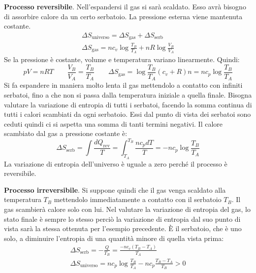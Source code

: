 \documentclass[10pt,a4paper]{book}
\begin{document}
\begin{figure}[htpb]
\end{figure}
\FloatBarrier

\textbf{Processo reversibile}. Nell'espandersi il gas si sarà scaldato. Esso avrà bisogno di assorbire calore da un certo serbatoio. La pressione esterna viene mantenuta costante.
\begin{gather*}
	\Delta S_{\text{universo} } = \Delta S_{\text{gas} } + \Delta S_{\text{serb} } \\
	\Delta S_{\text{gas} } = nc_v \log \frac{T_B }{T_A } + nR\log \frac{V_B }{V_A }
\end{gather*}
Se la pressione è costante, volume e temperatura variano linearmente. Quindi:
\[
	pV=nRT \qquad \frac{V_B }{V_A } = \frac{T_B }{T_A } \qquad \Delta S_{\text{gas} } = \log \frac{T_B }{T_A }(c_v+R)n = nc_p\log \frac{T_B }{T_A }
\]
Si fa espandere in maniera molto lenta il gas mettendolo a contatto con infiniti serbatoi, fino a che non si passa dalla temperatura iniziale a quella finale. Bisogna valutare la variazione di entropia di tutti i serbatoi, facendo la somma continua di tutti i calori scambiati da ogni serbatoio. Essi dal punto di vista dei serbatoi sono ceduti quindi ci si aspetta una somma di tanti termini negativi. Il calore scambiato dal gas a pressione costante è:
\[
	\Delta S_{\text{serb} } = \int \frac{dQ_{\text{rev} } }{T} = \int_{T_A }^{T_B } \frac{n c_p dT }{T} = - nc_p\log \frac{T_B }{T_A }
\]
La variazione di entropia dell'universo è uguale a zero perché il processo è reversibile.

\textbf{Processo irreversibile}. Si suppone quindi che il gas venga scaldato alla temperatura $T_B$ mettendolo immediatamente a contatto con il serbatoio $T_B$. Il gas scambierà calore solo con lui. Nel valutare la variazione di entropia del gas, lo stato finale è sempre lo stesso perciò la variazione di entropia dal suo punto di vista sarà la stessa ottenuta per l'esempio precedente. È il serbatoio, che è uno solo, a diminuire l'entropia di una quantità minore di quella vista prima:
\begin{gather*}
	\Delta S_{\text{serb} } = - \frac{Q}{T_B } = \frac{-nc_v(T_B-T_A)}{T_A} \\
	\Delta S_{\text{universo}} = nc_p\log \frac{T_B }{T_A } - nc_p\frac{T_B - T_A  }{T_B } > 0
\end{gather*}
\end{document}
